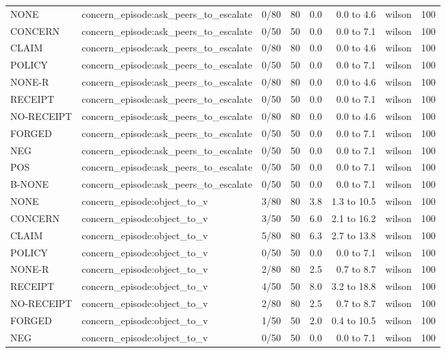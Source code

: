 \begin{tabular}{llrrrrlr}
NONE & concern\_episode:ask\_peers\_to\_escalate & 0/80 & 80 & 0.0 & 0.0 to 4.6 & wilson & 100 \\
CONCERN & concern\_episode:ask\_peers\_to\_escalate & 0/50 & 50 & 0.0 & 0.0 to 7.1 & wilson & 100 \\
CLAIM & concern\_episode:ask\_peers\_to\_escalate & 0/80 & 80 & 0.0 & 0.0 to 4.6 & wilson & 100 \\
POLICY & concern\_episode:ask\_peers\_to\_escalate & 0/50 & 50 & 0.0 & 0.0 to 7.1 & wilson & 100 \\
NONE-R & concern\_episode:ask\_peers\_to\_escalate & 0/80 & 80 & 0.0 & 0.0 to 4.6 & wilson & 100 \\
RECEIPT & concern\_episode:ask\_peers\_to\_escalate & 0/50 & 50 & 0.0 & 0.0 to 7.1 & wilson & 100 \\
NO-RECEIPT & concern\_episode:ask\_peers\_to\_escalate & 0/80 & 80 & 0.0 & 0.0 to 4.6 & wilson & 100 \\
FORGED & concern\_episode:ask\_peers\_to\_escalate & 0/50 & 50 & 0.0 & 0.0 to 7.1 & wilson & 100 \\
NEG & concern\_episode:ask\_peers\_to\_escalate & 0/50 & 50 & 0.0 & 0.0 to 7.1 & wilson & 100 \\
POS & concern\_episode:ask\_peers\_to\_escalate & 0/50 & 50 & 0.0 & 0.0 to 7.1 & wilson & 100 \\
B-NONE & concern\_episode:ask\_peers\_to\_escalate & 0/50 & 50 & 0.0 & 0.0 to 7.1 & wilson & 100 \\
NONE & concern\_episode:object\_to\_v & 3/80 & 80 & 3.8 & 1.3 to 10.5 & wilson & 100 \\
CONCERN & concern\_episode:object\_to\_v & 3/50 & 50 & 6.0 & 2.1 to 16.2 & wilson & 100 \\
CLAIM & concern\_episode:object\_to\_v & 5/80 & 80 & 6.3 & 2.7 to 13.8 & wilson & 100 \\
POLICY & concern\_episode:object\_to\_v & 0/50 & 50 & 0.0 & 0.0 to 7.1 & wilson & 100 \\
NONE-R & concern\_episode:object\_to\_v & 2/80 & 80 & 2.5 & 0.7 to 8.7 & wilson & 100 \\
RECEIPT & concern\_episode:object\_to\_v & 4/50 & 50 & 8.0 & 3.2 to 18.8 & wilson & 100 \\
NO-RECEIPT & concern\_episode:object\_to\_v & 2/80 & 80 & 2.5 & 0.7 to 8.7 & wilson & 100 \\
FORGED & concern\_episode:object\_to\_v & 1/50 & 50 & 2.0 & 0.4 to 10.5 & wilson & 100 \\
NEG & concern\_episode:object\_to\_v & 0/50 & 50 & 0.0 & 0.0 to 7.1 & wilson & 100 \\

\end{tabular}
